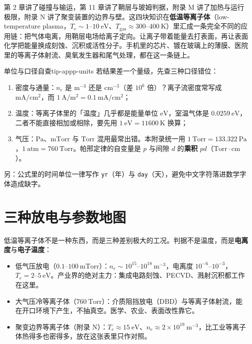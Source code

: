 
第 2 章讲了碰撞与输运，第 11 章讲了鞘层与玻姆判据，附录 M 讲了加热与运行极限，附录 N 讲了聚变装置的边界与壁。这四块知识在\textbf{低温等离子体}（low-temperature plasma，$T_e\sim1$--$10\ \mathrm{eV}$、$T_{\mathrm{gas}}\approx300$--$400\ \mathrm{K}$）里汇成一条完全不同的应用链：把气体电离，用鞘层电场给离子定向。让离子带着能量去打表面，再让表面化学把能量换成刻蚀、沉积或活性分子。手机里的芯片、镀在玻璃上的薄膜、医院里的等离子体射流、臭氧发生器和尾气处理，都在这一条链上。

\begin{tip}{单位与口径自查}{tip-appp-units}
若结果差一个量级，先查三种口径错位：
\begin{enumerate}[nosep,leftmargin=1.6em]
  \item 密度与通量：$n_e$ 是 $\mathrm{m}^{-3}$ 还是 $\mathrm{cm}^{-3}$（差 $10^6$ 倍）？离子流密度常写成 $\mathrm{mA/cm^2}$，而 $1\ \mathrm{A/m^2}=0.1\ \mathrm{mA/cm^2}$；
  \item 温度：等离子体里的「温度」几乎都是能量单位 $\mathrm{eV}$，室温气体是 $0.0259\ \mathrm{eV}$，二者不能直接相加或相除，要先用 $1\ \mathrm{eV}=11600\ \mathrm{K}$ 换算；
  \item 气压：$\mathrm{Pa}$、$\mathrm{mTorr}$ 与 $\mathrm{Torr}$ 混用最常出错。本附录统一用 $1\ \mathrm{Torr}=133.322\ \mathrm{Pa}$，$1\ \mathrm{atm}=760\ \mathrm{Torr}$。帕邢定律的自变量是 $p$ 与间隙 $d$ 的\textbf{乘积} $pd$（$\mathrm{Torr\cdot cm}$）。
\end{enumerate}
另：公式里的时间单位一律写作 \texttt{yr}（年）与 \texttt{day}（天），避免中文字符落进数学字体造成缺字。
\end{tip}

\section{三种放电与参数地图}
\label{sec:app-p-regimes}

低温等离子体不是一种东西，而是三种差别极大的工况。判据不是温度，而是\textbf{电离度}与\textbf{电子温度}：

\begin{itemize}[nosep,leftmargin=1.6em]
  \item 低气压放电（$0.1$--$100\ \mathrm{mTorr}$）：$n_e\sim10^{15}$--$10^{18}\ \mathrm{m}^{-3}$，电离度 $10^{-6}$--$10^{-3}$，$T_e=2$--$5\ \mathrm{eV}$。产业界的绝对主力：集成电路刻蚀、PECVD、溅射沉积都工作在这里。
  \item 大气压冷等离子体（$760\ \mathrm{Torr}$）：介质阻挡放电（DBD）与等离子体射流，能在开口环境下产生，不抽真空。医学、农业、表面改性靠它。
  \item 聚变边界等离子体（附录 N）：$T_e\approx15\ \mathrm{eV}$、$n_e\approx2\times10^{19}\ \mathrm{m}^{-3}$，比工业等离子体热得多也密得多，放在这张表里只作对照。
\end{itemize}

